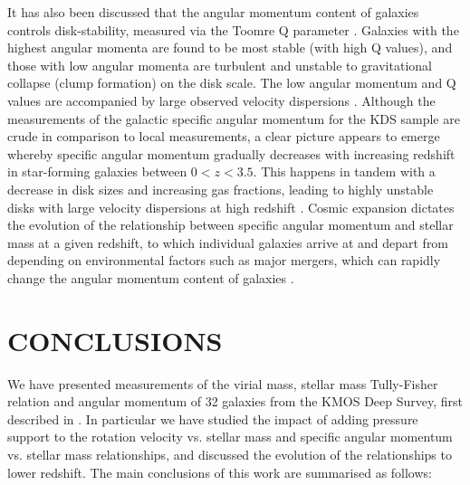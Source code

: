 \documentclass[fleqn,usenatbib]{mnras}
\begin{document}
\noindent
It has also been discussed that the angular momentum content of galaxies controls disk-stability, measured via the Toomre Q parameter \citep[e.g.][]{Obreschkow2016,Swinbank2017}.
Galaxies with the highest angular momenta are found to be most stable (with high Q values), and those with low angular momenta are turbulent and unstable to gravitational collapse (clump formation) on the disk scale.
The low angular momentum and Q values are accompanied by large observed velocity dispersions \citep{Obreschkow2016}.
Although the measurements of the galactic specific angular momentum for the KDS sample are crude in comparison to local measurements, a clear picture appears to emerge whereby specific angular momentum gradually decreases with increasing redshift in star-forming galaxies between $0 < z < 3.5$.
This happens in tandem with a decrease in disk sizes and increasing gas fractions, leading to highly unstable disks with large velocity dispersions at high redshift \citep[e.g.][]{ForsterSchreiber2009,Gnerucci2011,Wisnioski2015,Turner2017}.
Cosmic expansion dictates the evolution of the relationship between specific angular momentum and stellar mass at a given redshift, to which individual galaxies arrive at and depart from depending on environmental factors such as major mergers, which can rapidly change the angular momentum content of galaxies \citep[e.g.][]{Genel2015,Obreschkow2016,Lagos2017}.  

\section{CONCLUSIONS}\label{sec:conclusion}
We have presented measurements of the virial mass, stellar mass Tully-Fisher relation and angular momentum of 32 galaxies from the KMOS Deep Survey, first described in \cite{Turner2017}.
In particular we have studied the impact of adding pressure support to the rotation velocity vs. stellar mass and specific angular momentum vs. stellar mass relationships, and discussed the evolution of the relationships to lower redshift.
The main conclusions of this work are summarised as follows:
\end{document}
